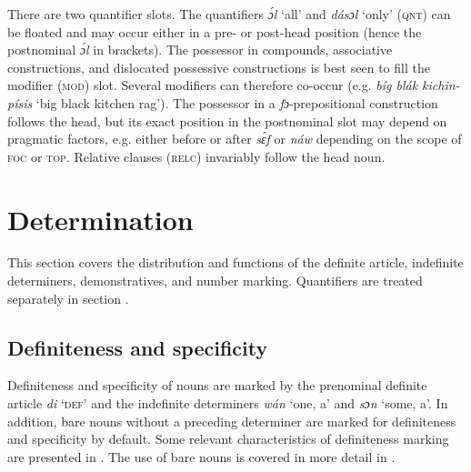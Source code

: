 There are two quantifier slots. The quantifiers \textit{ɔ́l} ‘all’ and \textit{dásɔl} ‘only’ (\textsc{qnt}) can be floated and may occur either in a pre- or post-head position (hence the postnominal \textit{ɔ́l} in brackets). The possessor in compounds, associative constructions, and dislocated possessive constructions is best seen to fill the modifier (\textsc{mod}) slot. Several modifiers can therefore co-occur (e.g. \textit{bíg blák kichin-písis} ‘big black kitchen rag’). The possessor in a \textit{fɔ}-prepositional construction follows the head, but its exact position in the postnominal slot may depend on pragmatic factors, e.g. either before or after \textit{sɛ́f} or \textit{náw} depending on the scope of \textsc{foc} or \textsc{top}. Relative clauses (\textsc{relc}) invariably follow the head noun. 


\section{Determination}\label{sec:5.1}

This section covers the distribution and functions of the definite article, indefinite determiners, demonstratives, and number marking. Quantifiers are treated separately in section .

\subsection{Definiteness and specificity}

Definiteness and specificity of nouns are marked by the prenominal definite article \textit{di} ‘\textsc{def}’ and the indefinite determiners \textit{wán} ‘one, a’ and \textit{sɔn} ‘some, a’. In addition, bare nouns without a preceding determiner are marked for definiteness and specificity by default. Some relevant characteristics of definiteness marking are presented in . The use of bare nouns is covered in more detail in .


